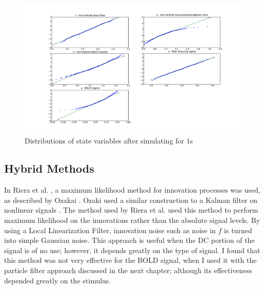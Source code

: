 \begin{figure}
\includegraphics[trim=6cm .75cm 6cm .75cm,width=16cm]{images/gauss_step_1sec_3sigma.pdf}
\caption{Distributions of state variables after simulating for $1$s}
\label{fig:trans1s}
\end{figure}

\subsection{Hybrid Methods}
In Riera et al. \cite{Riera2003}, a maximum
likelihood method for innovation processes was used, as described by
Ozakai \cite{Ozaki1994}. Ozaki \cite{Ozaki1994} used a similar construction to a 
Kalman filter on nonlinear signals \cite{Ozaki1994}. 
The method used by Riera et al.\cite{Riera2003} used this method to 
perform maximum likelihood on
the innovations rather than the absolute signal levels. 
By using a Local Linearization Filter,
innovation noise such as noise in $\dot{f}$ is turned into simple 
Gaussian noise. This approach is useful when the \ac{DC} portion of the signal is
of no use; however, it depends greatly on the type of signal. I found that
this method was not very effective for the \ac{BOLD} signal, when I used it 
with the particle filter approach discussed in the next chapter; although its
effectiveness depended greatly on the stimulus.

